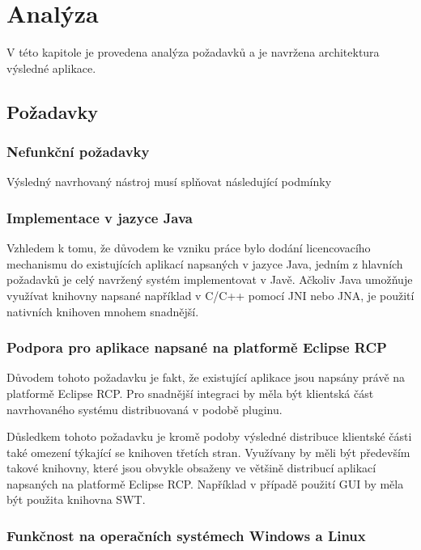 \chapter{Analýza}

V této kapitole je provedena analýza požadavků a je navržena architektura
výsledné aplikace.

\section{Požadavky}

\subsection{Nefunkční požadavky}

Výsledný navrhovaný nástroj musí splňovat následující podmínky

\subsection{Implementace v jazyce Java}

Vzhledem k tomu, že důvodem ke vzniku práce bylo dodání licencovacího mechanismu
do existujících aplikací napsaných v jazyce Java, jedním z hlavních požadavků
je celý navržený systém implementovat v Javě. Ačkoliv Java umožňuje využívat
knihovny napsané například v C/C++ pomocí JNI\cite{jni} nebo JNA\cite{jna}, je
použití nativních knihoven mnohem snadnější.


\subsection{Podpora pro aplikace napsané na platformě Eclipse RCP}

Důvodem tohoto požadavku je fakt, že existující aplikace jsou napsány právě na
platformě Eclipse RCP\cite{eclipse-rcp}. Pro snadnější integraci by měla být
klientská část navrhovaného systému distribuovaná v podobě pluginu.

Důsledkem tohoto požadavku je kromě podoby výsledné distribuce klientské části
také omezení týkající se knihoven třetích stran. Využívany by měli být především
takové knihovny, které jsou obvykle obsaženy ve většině distribucí aplikací
napsaných na platformě Eclipse RCP. Například v případě použití GUI by měla být
použita knihovna SWT\cite{swt}.

\subsection{Funkčnost na operačních systémech Windows a Linux}

